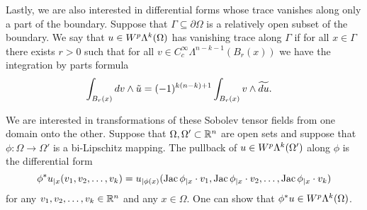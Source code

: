 \documentclass[12pt,a4paper]{article}
\begin{document}
Lastly, we are also interested in differential forms whose trace vanishes along only a part of the boundary. 
Suppose that $\Gamma \subseteq \partial\Omega$ is a relatively open subset of the boundary. 
We say that $u \in W^p\Lambda^{k}(\Omega)$ has vanishing trace along $\Gamma$ if for all $x \in \Gamma$ there exists $r > 0$
such that for all $v \in C^{\infty}_{c}\Lambda^{n-k-1}(B_r(x))$ we have the integration by parts formula
\begin{align*}
    \int_{B_r(x)} d v \wedge \tilde u
    &=
    (-1)^{k(n-k)+1}
    \int_{B_r(x)} v \wedge \widetilde{d u}
    .
\end{align*}

We are interested in transformations of these Sobolev tensor fields from one domain onto the other. 
Suppose that $\Omega,\Omega' \subset {\mathbb R}^{n}$ are open sets and suppose that $\phi: \Omega \to \Omega'$ is a bi-Lipschitz mapping.
The pullback of $u \in W^p\Lambda^{k}(\Omega')$ along $\phi$ is the differential form 
\[ 
    \phi^{\ast}u_{|x}( v_{1}, v_{2}, \ldots, v_{k} ) 
    = 
    u_{|\phi(x)}( \operatorname{{\rm Jac}}\phi_{|x} \cdot v_1, \operatorname{{\rm Jac}}\phi_{|x} \cdot v_2, \ldots, \operatorname{{\rm Jac}}\phi_{|x} \cdot v_k ) 
\]
for any $v_1, v_2, \dots, v_k \in {\mathbb R}^{n}$ and any $x \in \Omega$. One can show that $\phi^{\ast}u \in W^p\Lambda^{k}(\Omega)$.

\end{document}
